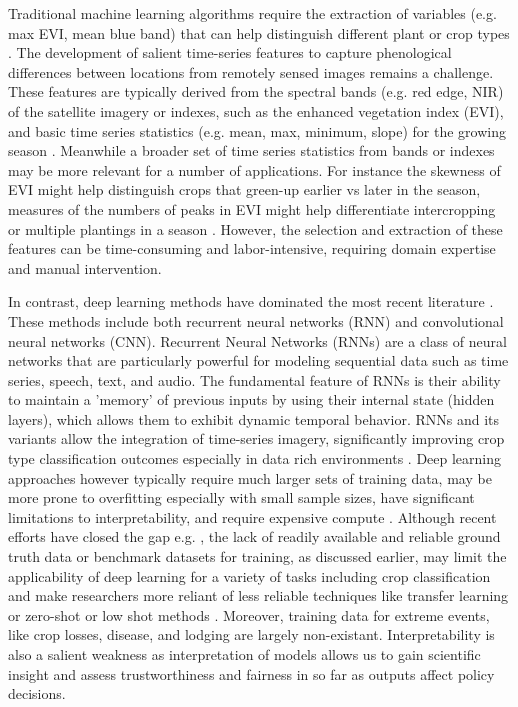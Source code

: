 \documentclass[journal]{IEEEtran}
\begin{document}
Traditional machine learning algorithms require the extraction of variables (e.g. max EVI, mean blue band) that can help distinguish different plant or crop types \cite{begue2018remote}. The development of salient time-series features to capture phenological differences between locations from remotely sensed images remains a challenge. These features are typically derived from the spectral bands (e.g. red edge, NIR) of the satellite imagery or indexes, such as the enhanced vegetation index (EVI), and basic time series statistics (e.g. mean, max, minimum, slope) for the growing season \cite{morton2006cropland}. Meanwhile a broader set of time series statistics from bands or indexes may be more relevant for a number of applications. For instance the skewness of EVI might help distinguish crops that green-up earlier vs later in the season, measures of the numbers of peaks in EVI might help differentiate intercropping or multiple plantings in a season \cite{begue2018remote}. However, the selection and extraction of these features can be time-consuming and labor-intensive, requiring domain expertise and manual intervention.

In contrast, deep learning methods have dominated the most recent literature \cite{agriculture13050965, hohl2024recent}. These methods include both recurrent neural networks (RNN) and convolutional neural networks (CNN). Recurrent Neural Networks (RNNs) are a class of neural networks that are particularly powerful for modeling sequential data such as time series, speech, text, and audio. The fundamental feature of RNNs is their ability to maintain a 'memory' of previous inputs by using their internal state (hidden layers), which allows them to exhibit dynamic temporal behavior. RNNs and its variants allow the integration of time-series imagery, significantly improving crop type classification outcomes especially in data rich environments \cite{agriculture13050965, camps2021deep}. Deep learning approaches however typically require much larger sets of training data, may be more prone to overfitting especially with small sample sizes, have significant limitations to interpretability, and require expensive compute \cite{hohl2024recent, rs13132591, agriculture13050965, LI2023103345, MA2019166}. Although recent efforts have closed the gap e.g. \cite{tseng2021cropharvest}, the lack of readily available and reliable ground truth data or benchmark datasets for training, as discussed earlier, may limit the applicability of deep learning for a variety of tasks including crop classification and make researchers more reliant of less reliable techniques like transfer learning or zero-shot or low shot methods \cite{owusu2024towards, LI2023103345, MA2019166}. Moreover, training data for extreme events, like crop losses, disease, and lodging are largely non-existant.  Interpretability is also a salient weakness as interpretation of models allows us to gain scientific insight and assess trustworthiness and fairness in so far as outputs affect policy decisions.  
\end{document}
